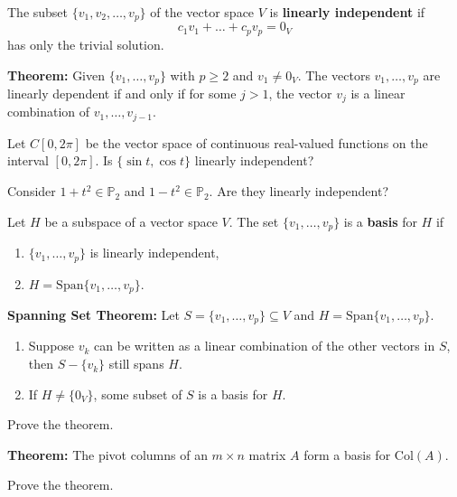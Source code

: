 \newpage

\begin{defn}
	The subset $\{ v_1, v_2, \dots, v_p\}$ of the vector space $V$ is {\bf linearly independent} if $$c_1 v_1+\dots+ c_p v_p =0_V$$ has only the trivial solution.
\end{defn}

{\bf Theorem:} Given $\{ v_1, \dots, v_p\}$ with $p\geq 2$ and $v_1\neq 0_V$. The vectors $v_1, \dots, v_p$ are linearly dependent if and only if for some $j>1$, the vector $v_j$ is a linear combination of $v_1, \dots, v_{j-1}$.

\begin{enumerate}


\Problem 
\Part Let $C[0,2\pi]$ be the vector space of continuous real-valued functions on the interval $[0,2\pi]$. Is $\{ \sin{t}, \cos{t} \}$ linearly independent?

\vfill

\Part Consider $1+t^2 \in \mathbb{P}_2$ and $1-t^2 \in \mathbb{P}_2$. Are they linearly independent?

\vfill

\newpage

\begin{defn} Let $H$ be a subspace of a vector space $V$. The set $\{v_1, \dots, v_p\}$ is a {\bf basis} for $H$ if
	\begin{enumerate}
		\item  $\{v_1, \dots, v_p\}$ is linearly independent,
		\item $H=\text{Span}\{v_1, \dots, v_p \}$.
	\end{enumerate}
\end{defn}

{\bf Spanning Set Theorem:} Let $S=\{ v_1,\dots,v_p\} \subseteq V$ and $H=\text{Span}\{v_1,\dots, v_p \}$.
\begin{enumerate}
	\item Suppose $v_k$ can be written as a linear combination of the other vectors in $S$, then $S-\{v_k\}$ still spans $H$.
	\item If $H\neq \{ 0_V\}$, some subset of $S$ is a basis for $H$.
\end{enumerate} 

\Problem Prove the theorem.

\newpage

{\bf Theorem:} The pivot columns of an $m \times n$ matrix $A$ form a basis for $\text{Col}(A)$.

\Problem Prove the theorem.


\end{enumerate}
